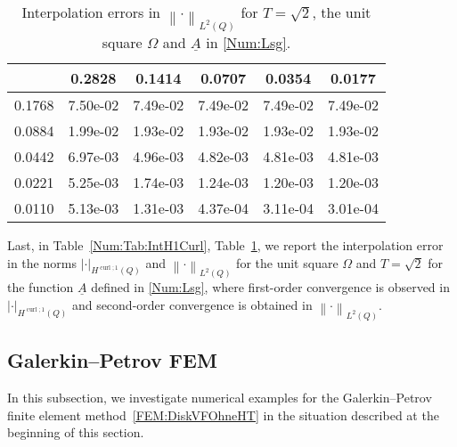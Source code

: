 \documentclass[a4paper,11pt]{article}
\newcommand{\cu}{\operatorname{curl}}
\renewcommand{\vec}[1]{\underline{#1}}
\newcommand{\abs}[1]{\left\lvert{#1}\right\rvert}
\newcommand{\norm}[1]{{\left\lVert{#1}\right\rVert}}
\begin{document}
\begin{table}[ht!]
	\begin{center}
		\begin{footnotesize}\begin{tabular}{r||c|c|c|c|c}
				\diagbox{$h_x$}{\vspace*{-.1cm}$h_t$} & 0.2828 & 0.1414 & 0.0707 & 0.0354 & 0.0177   \\
				\hline\hline
				0.1768 & 7.50e-02 & 7.49e-02 & 7.49e-02 & 7.49e-02 & 7.49e-02 \\
				0.0884 & 1.99e-02 & 1.93e-02 & 1.93e-02 & 1.93e-02 & 1.93e-02 \\
				0.0442 & 6.97e-03 & 4.96e-03 & 4.82e-03 & 4.81e-03 & 4.81e-03 \\
				0.0221 & 5.25e-03 & 1.74e-03 & 1.24e-03 & 1.20e-03 & 1.20e-03 \\
				0.0110 & 5.13e-03 & 1.31e-03 & 4.37e-04 & 3.11e-04 & 3.01e-04
		\end{tabular}\end{footnotesize}
		\caption{Interpolation errors in $\norm{\cdot}_{L^2(Q)}$ for $T=\sqrt{2}$, the unit square $\Omega$ and $\vec A$ in \eqref{Num:Lsg}.} \label{Num:Tab:IntL2}
	\end{center}
\end{table}

Last, in Table~\ref{Num:Tab:IntH1Curl}, Table~\ref{Num:Tab:IntL2}, we report the interpolation error in the norms $\abs{\cdot}_{H^{\cu;1}(Q)}$ and $\norm{\cdot}_{L^2(Q)}$ for the unit square $\Omega$ and $T=\sqrt{2}$ for the function $\vec A$ defined in \eqref{Num:Lsg}, where first-order convergence is observed in $\abs{\cdot}_{H^{\cu;1}(Q)}$ and second-order convergence is obtained in $\norm{\cdot}_{L^2(Q)}$.


\subsection{Galerkin--Petrov FEM} \label{Sec:Num:Ohne}

In this subsection, we investigate numerical examples for the Galerkin--Petrov finite element method~\eqref{FEM:DiskVFOhneHT} in the situation described at the beginning of this section.
\end{document}
